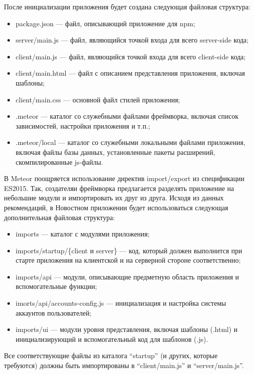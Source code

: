 \documentclass[a4paper,12pt]{article}
\begin{document}
После инициализации приложения будет создана следующая файловая структура:
\begin{itemize}
	\item package.json --- файл, описывающий приложение для npm;
	\item server/main.js --- файл, являющийся точкой входа для
	всего server-side кода;
	\item client/main.js --- файл, являющийся точкой входа для
	всего client-side кода;
	\item client/main.html --- файл с описанием представления приложения,
	включая шаблоны;
	\item client/main.css --- основной файл стилей приложения;
	\item .meteor --- каталог со служебными файлами фреймворка,
	включая список зависимостей, настройки приложения и т.п.;
	\item .meteor/local --- каталог со служебными локальными файлами 
	приложения, включая файлы базы данных, установленные пакеты 
	расширений, скомпилированные js-файлы.
\end{itemize}

В Meteor поощряется использование директив import/export из спецификации
ES2015. Так, создателяи фреймворка предлагается разделять приложение
на небольшие модули и импортировать их друг из друга. Исходя из
данных рекомендаций, в Новостном приложении будет использоваться следующая
дополнительная файловая структура:

\begin{itemize}
	\item imports --- каталог с модулями приложения;
	\item imports/startup/\{client и server\} --- код, который должен выполнится
	при старте приложения на клиентской и на серверной стороне соответственно;
	\item imports/api --- модули, описывающие предметную область приложения
	и вспомогательные функции;
	\item imorts/api/accounts-config.js --- инициализация и настройка системы аккаунтов пользователей;
	\item imports/ui --- модули уровня представления, включая шаблоны (.html) 
	и инициализирующий и вспомогательный код для шаблонов (.js).
\end{itemize}

Все соответствующие файлы из каталога ``startup'' (и
других, которые требуются) должны быть
импортированы в ``client/main.js'' и ``server/main.js''.
\end{document}
